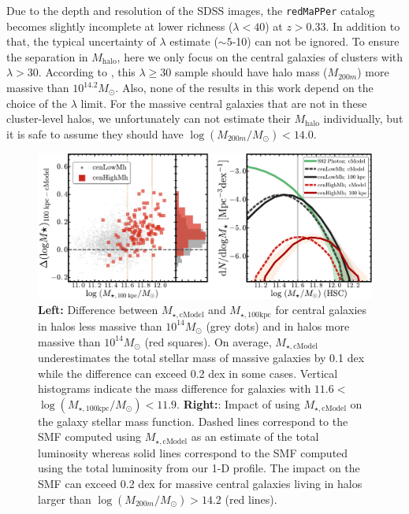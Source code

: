 \documentclass[a4paper,fleqn,usenatbib]{mnras}
\def\redm{\texttt{redMaPPer}}
\def\mhalo{{$M_{\mathrm{halo}}$}}
\def\mtot{{$M_{\star,100\mathrm{kpc}}$}}
\def\mcmodel{{$M_{\star,\mathrm{cModel}}$}}
\def\logmtot{{$\log (M_{\star,100\mathrm{kpc}}/M_{\odot})$}}
\begin{document}
    Due to the depth and resolution of the SDSS images, the \redm{} catalog 
    becomes slightly incomplete at lower richness ($\lambda < 40$) at $z > 0.33$. 
    In addition to that, the typical uncertainty of $\lambda$ estimate ($\sim 5$-10) 
    can not be ignored. 
    To ensure the separation in \mhalo{}, here we only focus on the central galaxies of
    clusters with $\lambda > 30$. 
    According to \citet{Simet2016}, this $\lambda \geq 30$ sample should have halo mass
    ($M_{200m}$) more massive than $10^{14.2} M_{\odot}$. 
    Also, none of the results in this work depend on the choice of the $\lambda$ 
    limit.
    For the massive central galaxies that are not in these cluster-level halos, 
    we unfortunately can not estimate their \mhalo{} individually, but it is safe 
    to assume they should have $\log (M_{200m}/M_{\odot}) < 14.0$.  
    

  \begin{figure}
      \centering 
      \includegraphics[width=\textwidth]{fig/redbcg_smf_new}
      \caption{
          \textbf{Left:} Difference between \mcmodel{} and \mtot{} for central
      	  galaxies in halos less massive than $10^{14} M_{\odot}$ (grey dots) and 
      	  in halos more massive than $10^{14} M_{\odot}$ (red squares). 
          On average, \mcmodel{} underestimates the total stellar mass of massive 
          galaxies by 0.1 dex while the difference can exceed 0.2 dex in some cases.
          Vertical histograms indicate the mass difference for galaxies with
          $11.6<$\logmtot{}$<11.9$. 
          \textbf{Right:}: Impact of using \mcmodel{} on the galaxy stellar mass
          function. 
          Dashed lines correspond to the SMF computed using \mcmodel{} as an estimate
          of the total luminosity whereas solid lines correspond to the SMF computed
          using the total luminosity from our 1-D profile. 
          The impact on the SMF can exceed 0.2 dex for massive central galaxies 
          living in halos larger than $\log (M_{200m}/M_{\odot}) > 14.2$ (red lines).
          }
      \label{fig:smf1}
  \end{figure}
          
\end{document}
